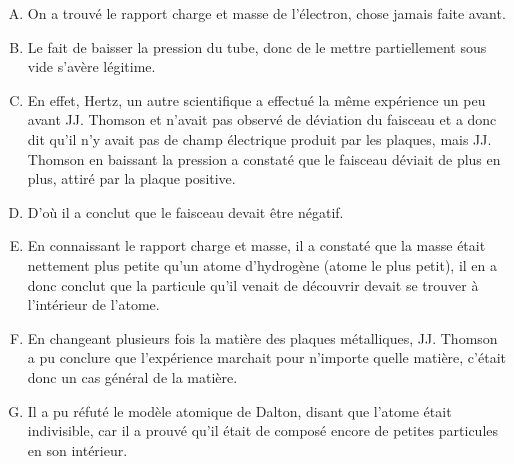 \documentclass[../main.tex]{subfiles}
\begin{document}
\begin{enumerate}[I]
\begin{enumerate}[A. ]
        \item On a trouvé le rapport charge et masse de l'électron, chose jamais faite avant.
        \item Le fait de baisser la pression du tube, donc de le mettre partiellement sous vide s'avère légitime.
        \item En effet, Hertz, un autre scientifique a effectué la même expérience un peu avant JJ. Thomson et n'avait pas observé de déviation du faisceau et a donc dit qu'il n'y avait pas de champ électrique produit par les plaques, mais JJ. Thomson en baissant la pression a constaté que le faisceau déviait de plus en plus, attiré par la plaque positive.
        \item D'où il a conclut que le faisceau devait être négatif.
        \item En connaissant le rapport charge et masse, il a constaté que la masse était nettement plus petite qu'un atome d'hydrogène (atome le plus petit), il en a donc conclut que la particule qu'il venait de découvrir devait se trouver à l'intérieur de l'atome.
        \item En changeant plusieurs fois la matière des plaques métalliques, JJ. Thomson a pu conclure que l'expérience marchait pour n'importe quelle matière, c'était donc un cas général de la matière.
        \item Il a pu réfuté le modèle atomique de Dalton, disant que l'atome était indivisible, car il a prouvé qu'il était de composé encore de petites particules en son intérieur.
    \end{enumerate}
\end{enumerate}



\end{document}
